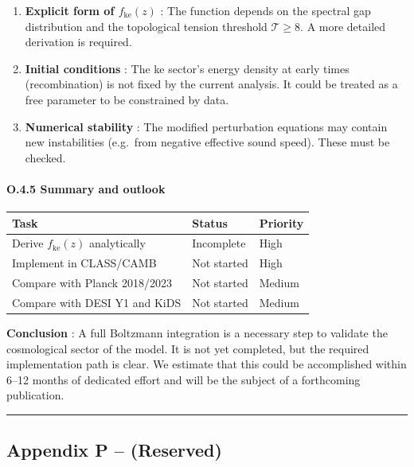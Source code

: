 \documentclass[11pt]{article}
\providecommand{\tightlist}{\setlength{\itemsep}{2pt}\setlength{\parskip}{6pt}}
\let\oldmathcal\mathcal
\renewcommand{\mathcal}[1]{\oldmathcal{#1}}
\providecommand{\tightlist}{%
  \setlength{\itemsep}{2pt}\setlength{\parskip}{6pt}
}
\begin{document}
\begin{enumerate}
\def\labelenumi{\arabic{enumi}.}
\tightlist
\item
  \textbf{Explicit form of \(f_{\text{ke}}(z)\)} : The function depends
  on the spectral gap distribution and the topological tension threshold
  \(\mathcal{T} \ge 8\). A more detailed derivation is required.
\item
  \textbf{Initial conditions} : The ke sector's energy density at early
  times (recombination) is not fixed by the current analysis. It could
  be treated as a free parameter to be constrained by data.
\item
  \textbf{Numerical stability} : The modified perturbation equations may
  contain new instabilities (e.g.~from negative effective sound speed).
  These must be checked.
\end{enumerate}

\hypertarget{o.4.5-summary-and-outlook}{%
\paragraph{O.4.5 Summary and outlook}\label{o.4.5-summary-and-outlook}}

\begin{longtable}[]{@{}lll@{}}
\toprule
Task & Status & Priority \\
\midrule
\endhead
Derive \(f_{\text{ke}}(z)\) analytically & Incomplete & High \\
Implement in CLASS/CAMB & Not started & High \\
Compare with Planck 2018/2023 & Not started & Medium \\
Compare with DESI Y1 and KiDS & Not started & Medium \\
\bottomrule
\end{longtable}

\textbf{Conclusion} : A full Boltzmann integration is a necessary step
to validate the cosmological sector of the model. It is not yet
completed, but the required implementation path is clear. We estimate
that this could be accomplished within 6--12 months of dedicated effort
and will be the subject of a forthcoming publication.

\begin{center}\rule{0.5\linewidth}{0.5pt}\end{center}

\hypertarget{appendix-p-reserved}{%
\subsection{Appendix P -- (Reserved)}\label{appendix-p-reserved}}
\end{document}
